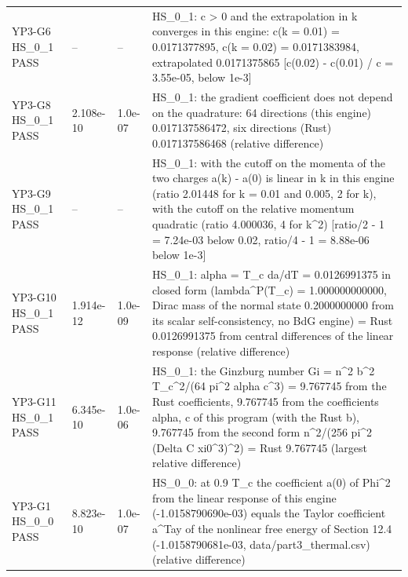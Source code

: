\documentclass[aps,prd,onecolumn,superscriptaddress,nofootinbib,floatfix,longbibliography]{revtex4-2}
\begin{document}
\begin{longtable}{p{}p{}p{}p{}}
YP3-G6 HS\_0\_1 \newline PASS & -- & -- & HS\_0\_1: c \textgreater{} 0 and the extrapolation in k converges in this engine: c(k = 0.01) = 0.0171377895, c(k = 0.02) = 0.0171383984, extrapolated 0.0171375865 [\textbar{}c(0.02) - c(0.01)\textbar{} / c = 3.55e-05, below 1e-3] \\
YP3-G8 HS\_0\_1 \newline PASS & 2.108e-10 & 1.0e-07 & HS\_0\_1: the gradient coefficient does not depend on the quadrature: 64 directions (this engine) 0.017137586472, six directions (Rust) 0.017137586468 (relative difference) \\
YP3-G9 HS\_0\_1 \newline PASS & -- & -- & HS\_0\_1: with the cutoff on the momenta of the two charges a(k) - a(0) is linear in \textbar{}k\textbar{} in this engine (ratio 2.01448 for k = 0.01 and 0.005, 2 for \textbar{}k\textbar{}), with the cutoff on the relative momentum quadratic (ratio 4.000036, 4 for k\textasciicircum{}2) [\textbar{}ratio/2 - 1\textbar{} = 7.24e-03 below 0.02, \textbar{}ratio/4 - 1\textbar{} = 8.88e-06 below 1e-3] \\
YP3-G10 HS\_0\_1 \newline PASS & 1.914e-12 & 1.0e-09 & HS\_0\_1: alpha = T\_c da/dT = 0.0126991375 in closed form (lambda\textasciicircum{}P(T\_c) = 1.000000000000, Dirac mass of the normal state 0.2000000000 from its scalar self-consistency, no BdG engine) = Rust 0.0126991375 from central differences of the linear response (relative difference) \\
YP3-G11 HS\_0\_1 \newline PASS & 6.345e-10 & 1.0e-06 & HS\_0\_1: the Ginzburg number Gi = n\textasciicircum{}2 b\textasciicircum{}2 T\_c\textasciicircum{}2/(64 pi\textasciicircum{}2 alpha c\textasciicircum{}3) = 9.767745 from the Rust coefficients, 9.767745 from the coefficients alpha, c of this program (with the Rust b), 9.767745 from the second form n\textasciicircum{}2/(256 pi\textasciicircum{}2 (Delta C xi0\textasciicircum{}3)\textasciicircum{}2) = Rust 9.767745 (largest relative difference) \\
YP3-G1 HS\_0\_0 \newline PASS & 8.823e-10 & 1.0e-07 & HS\_0\_0: at 0.9 T\_c the coefficient a(0) of \textbar{}Phi\textbar{}\textasciicircum{}2 from the linear response of this engine (-1.0158790690e-03) equals the Taylor coefficient a\textasciicircum{}Tay of the nonlinear free energy of Section 12.4 (-1.0158790681e-03, data/part3\_thermal.csv) (relative difference) \\

\end{longtable}
\end{document}
